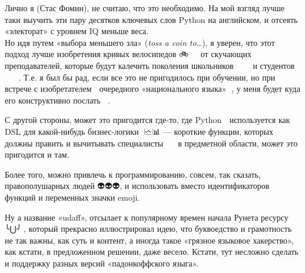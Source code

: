 ﻿\documentclass[a4paper,12pt]{article}
\begin{document}

Лично я (Стас Фомин), не считаю, что это необходимо. На мой взгляд лучше
таки выучить эти пару десятков ключевых слов Python на английском, и
отсеять «электорат» с уровнем IQ меньше веса.\\
Но идя путем «выбора меньшего зла» (\emph{toss a coin to\ldots{}}), я
уверен, что этот подход лучше изобретения кривых велосипедов 🚲🚵‍♀🚵‍♀ от
скучающих преподавателей, которые будут калечить поколения школьников
👨‍🎓👨‍🎓👨‍🎓 и студентов 👩‍🎓👩‍🎓👩‍🎓. Т.е. я был бы рад, если все это не
пригодилось при обучении, но при встрече с изобретателем 🤡 очередного
«национального языка» 📜, у меня будет куда его конструктивно послать
🤦‍♂.

С другой стороны, может это пригодится где-то, где Python 🐍 используется
как DSL для какой-нибудь бизнес-логики 🧮🗠📊 --- короткие функции, которых
должны править и вычитывать специалисты 🧙‍♂️🧙‍♂️ в предметной области,
может это пригодится и там.

Более того, можно привлечь к программированию, совсем, так сказать,
правополушарных людей 👽👽👽, и использовать вместо идентификаторов функций
и переменных значки emoji.

Ну а название «udaff», отсылает к популярному времен начала Рунета
ресурсу 🐍╰⋃╯🐍, который прекрасно иллюстрировал идею, что буквоедство и
грамотность не так важны, как суть и контент, а иногда такое «грязное
языковое хакерство», как кстати, в предложенном решении, даже весело.
Кстати, тут несложно сделать и поддержку разных версий «падонкоффского
языга».
\end{document}
